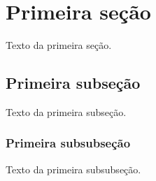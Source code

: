 \documentclass[a4paper,12pt,oneside,onecolumn,final,fleqn]{repUERJ}
\begin{document}
\section{Primeira seção}

Texto da primeira seção.

\subsection{Primeira subseção}

Texto da primeira subseção.

\subsubsection{Primeira subsubseção}

Texto da primeira subsubseção.









\end{document}

